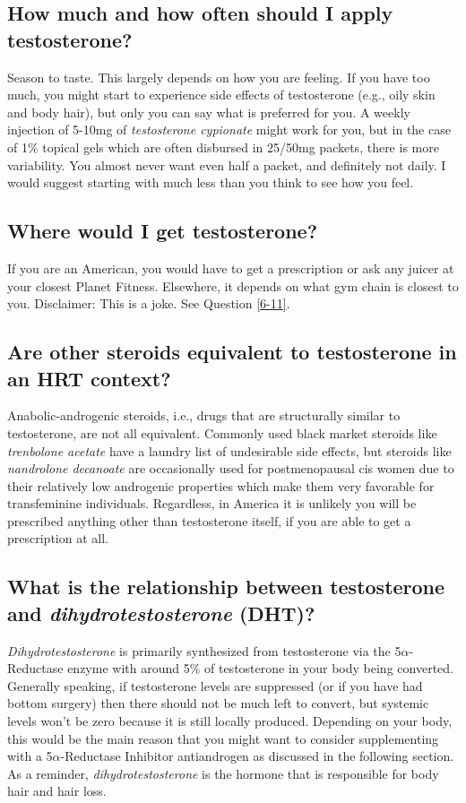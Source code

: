 \documentclass{article}
\begin{document}
\subsection{How much and how often should I apply testosterone?}

Season to taste. This largely depends on how you are feeling. If you have too much, you might start to experience side effects of testosterone (e.g., oily skin and body hair), but only you can say what is preferred for you. A weekly injection of 5-10mg of \textit{testosterone cypionate} might work for you, but in the case of 1\% topical gels which are often disbursed in 25/50mg packets, there is more variability. You almost never want even half a packet, and definitely not daily. I would suggest starting with much less than you think to see how you feel.

\subsection{Where would I get testosterone?}

If you are an American, you would have to get a prescription or ask any juicer at your closest Planet Fitness. Elsewhere, it depends on what gym chain is closest to you. Disclaimer: This is a joke. See Question \ref{6-11}.

\subsection{Are other steroids equivalent to testosterone in an HRT context?}

Anabolic-androgenic steroids, i.e., drugs that are structurally similar to testosterone, are not all equivalent. Commonly used black market steroids like \textit{trenbolone acetate} have a laundry list of undesirable side effects, but steroids like \textit{nandrolone decanoate} are occasionally used for postmenopausal cis women due to their relatively low androgenic properties which make them very favorable for transfeminine individuals. Regardless, in America it is unlikely you will be prescribed anything other than testosterone itself, if you are able to get a prescription at all.

\subsection{What is the relationship between testosterone and \textit{dihydrotestosterone} (DHT)?}

\textit{Dihydrotestosterone} is primarily synthesized from testosterone via the 5$\alpha$-Reductase enzyme with around 5\% of testosterone in your body being converted. Generally speaking, if testosterone levels are suppressed (or if you have had bottom surgery) then there should not be much left to convert, but systemic levels won’t be zero because it is still locally produced. Depending on your body, this would be the main reason that you might want to consider supplementing with a 5$\alpha$-Reductase Inhibitor antiandrogen as discussed in the following section. As a reminder, \textit{dihydrotestosterone} is the hormone that is responsible for body hair and hair loss.
\end{document}
